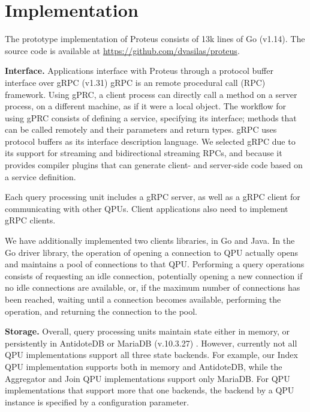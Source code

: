 \section{Implementation}
\label{sec:implementation}

The prototype implementation of Proteus consists of 13k lines of Go (v1.14).
The source code is available at \url{https://github.com/dvasilas/proteus}.


\bigskip
\noindent
\textbf{Interface.}
Applications interface with Proteus through a protocol buffer \cite{protobuf:docs} interface over gRPC (v1.31) \cite{grpc:docs}
gRPC is an remote procedural call (RPC) framework.
Using gPRC, a client process can directly call a method on a server process, on a different machine, as if it were a local object.
The workflow for using gPRC consists of defining a service, specifying its interface; methods that can be called remotely
and their parameters and return types.
gRPC uses protocol buffers as its interface description language.
We selected gRPC due to its support for streaming and bidirectional streaming RPCs,
and because it provides compiler plugins that can generate client- and server-side code based on a service definition.

Each query processing unit includes a gRPC server, as well as a gRPC client for communicating with other QPUs.
Client applications also need to implement gRPC clients.

\medskip
\noindent
We have additionally implemented two clients libraries, in Go and Java.
In the Go driver library, the operation of opening a connection to QPU actually opens and maintains a pool of connections
to that QPU.
Performing a query operations consists of requesting an idle connection, potentially opening a new connection if no idle
connections are available, or, if the maximum number of connections has been reached,  waiting until a connection becomes
available, performing the operation, and returning the connection to the pool.

\bigskip
\noindent
\textbf{Storage.}
Overall, query processing units maintain state either in memory, or persistently in AntidoteDB \cite{antidotedb:docs} or
MariaDB (v.10.3.27) \cite{mariadb:docs}.
However, currently not all QPU implementations support all three state backends.
For example, our Index QPU implementation supports both in memory and AntidoteDB,
while the Aggregator and Join QPU implementations support only MariaDB.
For QPU implementations that support more that one backends,
the backend by a QPU instance is specified by a configuration parameter.

